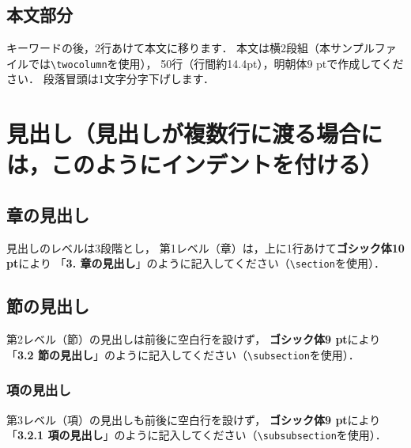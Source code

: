 \documentclass[a4paper]{jarticle}
\renewcommand{\baselinestretch}{1.32}
\begin{document}
\subsection{本文部分}

キーワードの後，2行あけて本文に移ります．
本文は横2段組（本サンプルファイルでは\verb+\twocolumn+を使用），
50行（行間約14.4pt），明朝体9 ptで作成してください．
段落冒頭は1文字分字下げします．

\begingroup
\renewcommand{\baselinestretch}{0.9}
\section{見出し（見出しが複数行に渡る場合には，このようにインデントを付ける）}
\endgroup

\subsection{章の見出し}%

見出しのレベルは3段階とし，
第1レベル（章）は，上に1行あけて{\bf ゴシック体10 pt}により
「{\bf 3. 章の見出し}」のように記入してください（\verb+\section+を使用）．

\subsection{節の見出し}

第2レベル（節）の見出しは前後に空白行を設けず，
{\bf ゴシック体9 pt}により「{\bf 3.2 節の見出し}」のように記入してください（\verb+\subsection+を使用）．

\subsubsection{項の見出し}

第3レベル（項）の見出しも前後に空白行を設けず，
{\bf ゴシック体9 pt}により「{\bf 3.2.1 項の見出し}」のように記入してください（\verb+\subsubsection+を使用）．
\end{document}
